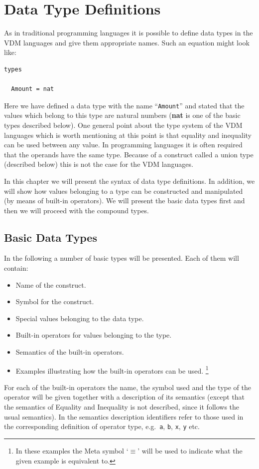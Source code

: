 \documentclass{overturerepchap}
\newcommand{\keyw}[1]{{\bf\ttfamily #1}}
\begin{document}
\chapter{Data Type Definitions}
\label{typedef}

As in traditional programming languages it is possible to define data
types in the VDM languages and give them appropriate names.
Such an equation might look like:

\begin{lstlisting}
types

  Amount = nat
\end{lstlisting}

Here we have defined a data type with the name ``{\tt Amount}'' and
stated that the values which belong to this type are natural numbers
(\keyw{nat} is one of the basic types described below). One general
point about the type system of the VDM languages which is
worth mentioning at this point is that equality and inequality can be
used between any value. In programming languages it is often required
that the operands have the same type. Because of a 
construct called a union type (described below) this is not the case
for the VDM languages.

In this chapter we will present the syntax of data type
definitions. In addition, we will show how values belonging to a type
can be constructed and manipulated (by means of built-in operators).
We will present the basic data types first and then we will proceed
with the compound types.

\section{Basic Data Types}

In the following a number of basic types will be presented. Each of
them will contain:

\begin{itemize}
\item Name of the construct.
\item Symbol for the construct.
\item Special values belonging to the data type.
\item Built-in operators for values belonging to the type.
\item Semantics of the built-in operators.
\item Examples illustrating how the built-in operators can be used.%
  \footnote{In these examples the Meta symbol `$\equiv$' will be used
    to indicate what the given example is equivalent to.}
\end{itemize}
For each of the built-in operators the name, the symbol used and the
type of the operator will be given together with a description of its
semantics (except that the semantics of Equality and Inequality is not
described, since it follows the usual semantics). In the semantics
description identifiers refer to those used in the corresponding
definition of operator type, e.g.\ {\tt a}, {\tt b}, {\tt x}, {\tt y}
etc.
\end{document}
